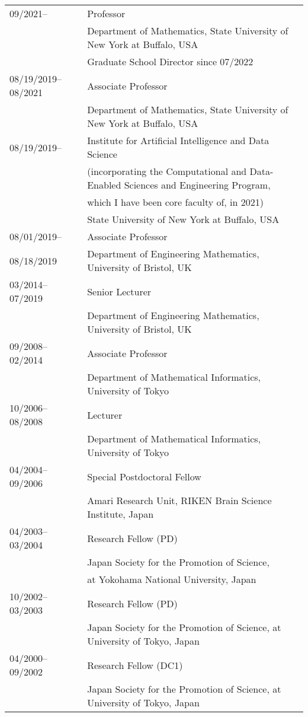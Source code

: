 \documentclass[11pt,letter]{article}
\begin{document}
\begin{tabular}{ll}
09/2021-- & Professor\\
& Department of Mathematics, State University of New York at Buffalo, USA\\
& Graduate School Director since 07/2022\\[1.5mm]
%
08/19/2019--08/2021 & Associate Professor\\
& Department of Mathematics, State University of New York at Buffalo, USA\\[1.5mm]
%
08/19/2019-- & Institute for Artificial Intelligence and Data Science\\
& (incorporating the Computational and Data-Enabled Sciences and Engineering Program,\\
& which I have been core faculty of, in 2021)\\
& State University of New York at Buffalo, USA\\[1.5mm] 
%
08/01/2019--& Associate Professor\\
08/18/2019 & Department of Engineering Mathematics, University of Bristol, UK\\[1.5mm]
%
03/2014--07/2019 & Senior Lecturer\\
& Department of Engineering Mathematics, University of Bristol, UK\\[1.5mm]
%
09/2008--02/2014 & Associate Professor\\
& Department of Mathematical Informatics, University of Tokyo\\[1.5mm]
%
10/2006--08/2008 & Lecturer\\
& Department of Mathematical Informatics, University of Tokyo\\[1.5mm]
%
04/2004--09/2006 & Special Postdoctoral Fellow\\
& Amari Research Unit, RIKEN Brain Science Institute, Japan\\[1.5mm]
%
04/2003--03/2004 & Research Fellow (PD)\\
& Japan Society for the Promotion of Science,\\
& at Yokohama National University, Japan\\[1.5mm]
%
10/2002--03/2003 & Research Fellow (PD)\\
& Japan Society for the Promotion of Science, at University of Tokyo, Japan\\[1.5mm]
%
04/2000--09/2002 & Research Fellow (DC1)\\
& Japan Society for the Promotion of Science, at University of Tokyo, Japan\\
\end{tabular}
%
\ \\
\ \\
\end{document}
